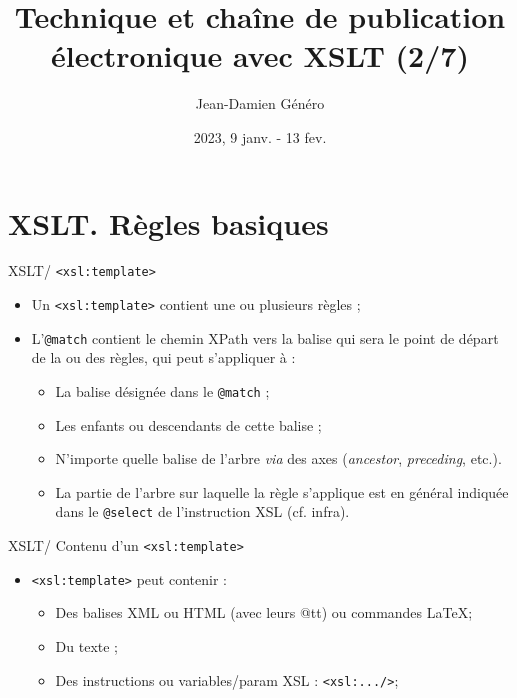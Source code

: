 \documentclass{beamer}
\title{Technique et chaîne de publication électronique avec XSLT (2/7)}
\date{2023, 9 janv. - 13 fev.}
\author{Jean-Damien Généro}
\institute{École nationale des chartes -- M2 TNAH}
\begin{document}
  \maketitle

  \section{XSLT. Règles basiques}

    \begin{frame}{XSLT/ \texttt{<xsl:template>}}
    \Large
        \begin{itemize}
            \item Un \texttt{<xsl:template>} contient une ou plusieurs règles ;
            \bigskip
            \item L'\texttt{@match} contient le chemin XPath vers la balise qui sera le point de départ de la ou des règles, qui peut s'appliquer à :
            \bigskip
            \begin{itemize}
            \large
                \item La balise désignée dans le \texttt{@match} ;
                \item Les enfants ou descendants de cette balise ;
                \item N'importe quelle balise de l'arbre \textit{via} des axes (\textit{ancestor}, \textit{preceding}, etc.).
                \bigskip
                \item La partie de l'arbre sur laquelle la règle s'applique est en général indiquée dans le \texttt{@select} de l'instruction XSL (cf. infra). %
            \end{itemize}
        \end{itemize}
    \end{frame}

     \begin{frame}{XSLT/ Contenu d'un \texttt{<xsl:template>}}
         \Large
         \begin{itemize}
             \item \texttt{<xsl:template>} peut contenir :
             \begin{itemize}
             \Large
                 \item Des balises XML ou HTML (avec leurs @tt) ou commandes \LaTeX ;
                 \item Du texte ;
                 \item Des instructions ou variables/param XSL : \texttt{<xsl:.../>};
             \end{itemize}
         \end{itemize}
     \end{frame}
\end{document}
